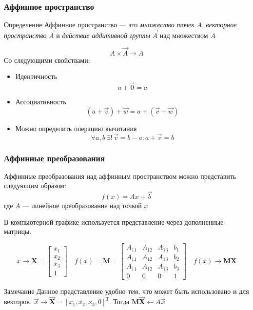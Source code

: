 \documentclass{beamer}
\begin{document}
\begin{frame}
\frametitle{Аффинное пространство}
\begin{alertblock}{Определение}
Аффинное пространство --- это \emph{множество точек} $A$, \emph{векторное пространство} $\vec{A}$ и \emph{действие аддитивной группы} $\vec{A}$ над множеством $A$
\end{alertblock}
\begin{equation*}
    A \times \vec{A} \rightarrow A
\end{equation*}
Со следующими свойствами:
\begin{itemize}
    \item Идентичность
        \begin{equation*}
            a + \vec{0} = a
        \end{equation*}
    \item Ассоциативность
        \begin{equation*}
            (a + \vec{v}) + \vec{w} = a + (\vec{v} + \vec{w}) 
        \end{equation*}
    \item Можно определить операцию вычитания
        \begin{equation*}
            \forall a, b \ \exists! \, \vec{v} = b - a: a + \vec{v} = b
        \end{equation*}
\end{itemize}
\end{frame}

\begin{frame}
\frametitle{Аффинные преобразования}
Аффинные преобразования над аффинным пространством можно представить следующим образом:
\begin{equation*}
    f(x) = Ax + \vec{b}
\end{equation*}
где $A$ --- линейное преобразование над точкой $x$

В компьютерной графике используется представление через дополненные матрицы.

\begin{equation*}
    x \rightarrow \textbf{X} = \left[\begin{matrix}
        x_1 \\
        x_2 \\
        x_3 \\
        1
    \end{matrix}\right] \quad f(x) = \textbf{M} = \left[\begin{matrix}
        A_{11} & A_{12} & A_{13} & b_1 \\
        A_{11} & A_{12} & A_{13} & b_2 \\
        A_{11} & A_{12} & A_{13} & b_3 \\
        0      & 0      & 0      & 1
    \end{matrix}\right] \quad f(x) \rightarrow \textbf{M} \textbf{X}
\end{equation*}
\begin{block}{Замечание}
    Данное представление удобно тем, что может быть использовано и для векторов. $\vec{x} \rightarrow \vec{\textbf{X}} = \left[x_1, x_2, x_3, 0\right]^T$. Тогда $\textbf{M}\vec{\textbf{X}} \leftarrow A \vec{x}$
\end{block}
\end{frame}
\end{document}
